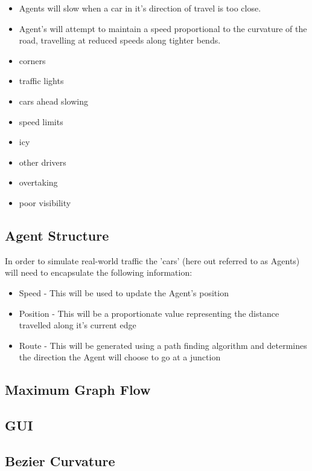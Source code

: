     \begin{itemize}
        \item Agents will slow when a car in it's direction of travel is too close.

        \item Agent's will attempt to maintain a speed proportional to the curvature of the road, travelling at reduced speeds along tighter bends.

        \item corners
        \item traffic lights
        \item cars ahead slowing
        \item speed limits
        \item icy
        \item other drivers
        \item overtaking
        \item poor visibility
    \end{itemize}

    \subsection{Agent Structure}

    In order to simulate real-world traffic the 'cars' (here out referred to as Agents) will need to encapsulate the following information:

    \begin{itemize}
        \item Speed - This will be used to update the Agent's position
        \item Position - This will be a proportionate value representing the distance travelled along it's current edge
        \item Route - This will be generated using a path finding algorithm and determines the direction the Agent will choose to go at a junction
    \end{itemize}

    \subsection{Maximum Graph Flow}

    \subsection{GUI}

    \subsection{Bezier Curvature}
